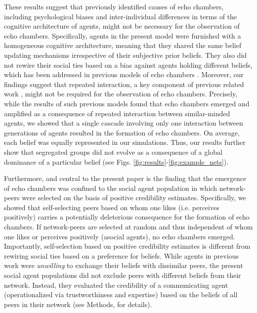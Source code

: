 \documentclass[fleqn,10pt]{wlscirep}
\begin{document}
These results suggest that previously identified causes of echo chambers, including psychological biases and inter-individual differences in terms of the cognitive architecture of agents, might not be necessary for the observation of echo chambers. Specifically, agents in the present model were furnished with a homogeneous cognitive architecture, meaning that they shared the same belief updating mechanisms irrespective of their subjective prior beliefs. They also did not rewire their social ties based on a bias against agents holding different beliefs, which has been addressed in previous models of echo chambers \cite{henry2011emergence, madsen2018large, sasahara2019inevitability}. Moreover, our findings suggest that repeated interaction, a key component of previous related work \cite{madsen2017growing, madsen2018large}, might not be required for the observation of echo chambers. Precisely, while the results of such previous models found that echo chambers emerged and amplified as a consequence of repeated interaction between similar-minded agents, we showed that a single cascade involving only one interaction between generations of agents resulted in the formation of echo chambers. On average, each belief was equally represented in our simulations. Thus, our results further show that segregated groups did not evolve as a consequence of a global dominance of a particular belief (see Figs. \ref{fig:results}-\ref{fig:example_nets}). 

Furthermore, and central to the present paper is the finding that the emergence of echo chambers was confined to the social agent population in which network-peers were selected on the basis of positive credibility estimates. Specifically, we showed that self-selecting peers based on whom one likes (i.e. perceives positively) carries a potentially deleterious consequence for the formation of echo chambers. If network-peers are selected at random and thus independent of whom one likes or perceives positively (asocial agents), no echo chambers emerged. Importantly, self-selection based on positive credibility estimates is different from rewiring social ties based on a preference for beliefs. While agents in previous work  \cite{henry2011emergence, madsen2018large} were \emph{unwilling} to exchange their beliefs with dissimilar peers, the present social agent populations did not exclude peers with different beliefs from their network. Instead, they evaluated the credibility of a communicating agent (operationalized via trustworthiness and expertise) based on the beliefs of all peers in their network (see Methods, for details).
\end{document}
